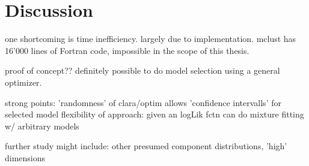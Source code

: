 \chapter{Discussion}




one shortcoming is time inefficiency. largely due to implementation.
mclust has 16'000 lines of Fortran code, impossible in the scope of this thesis.

proof of concept??
definitely possible to do model selection using a general optimizer.

strong points:
'randomness' of clara/optim allows 'confidence intervalls' for selected model
flexibility of approach: given an logLik fctn can do mixture fitting w/ arbitrary
models

further study might include: other presumed component distributions, 'high' dimensions

